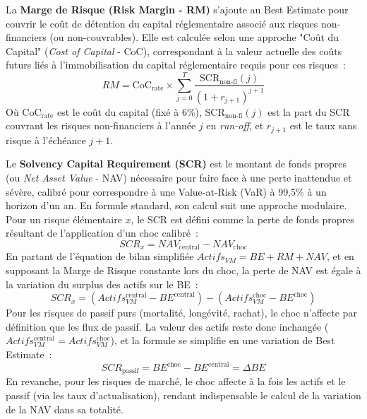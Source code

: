 \bigskip

La \textbf{Marge de Risque (Risk Margin - RM)} s'ajoute au Best Estimate pour couvrir le coût de détention du capital réglementaire associé aux risques non-financiers (ou non-couvrables). Elle est calculée selon une approche "Coût du Capital" (\textit{Cost of Capital} - CoC), correspondant à la valeur actuelle des coûts futurs liés à l'immobilisation du capital réglementaire requis pour ces risques~:
\begin{equation}
    RM = \text{CoC}_{\text{rate}} \times \sum_{j=0}^{T} \frac{\text{SCR}_{\text{non-fi}}(j)}{(1+r_{j+1})^{j+1}}
\end{equation}
Où $\text{CoC}_{\text{rate}}$ est le coût du capital (fixé à 6\%), $\text{SCR}_{\text{non-fi}}(j)$ est la part du SCR couvrant les risques non-financiers à l'année $j$ en \textit{run-off}, et $r_{j+1}$ est le taux sans risque à l'échéance $j+1$.

\bigskip

Le \textbf{Solvency Capital Requirement (SCR)} est le montant de fonds propres (ou \textit{Net Asset Value} - NAV) nécessaire pour faire face à une perte inattendue et sévère, calibré pour correspondre à une Value-at-Risk (VaR) à 99,5\% à un horizon d'un an. En formule standard, son calcul suit une approche modulaire. Pour un risque élémentaire $x$, le SCR est défini comme la perte de fonds propres résultant de l'application d'un choc calibré~:
\begin{equation}
    SCR_{x} = NAV_{\text{central}} - NAV_{\text{choc}}
\end{equation}
En partant de l'équation de bilan simplifiée $Actifs_{VM} = BE + RM + NAV$, et en supposant la Marge de Risque constante lors du choc, la perte de NAV est égale à la variation du surplus des actifs sur le BE~:
\begin{equation*}
    SCR_{x} = (Actifs_{VM}^{\text{central}} - BE^{\text{central}}) - (Actifs_{VM}^{\text{choc}} - BE^{\text{choc}})
\end{equation*}
Pour les risques de passif purs (mortalité, longévité, rachat), le choc n'affecte par définition que les flux de passif. La valeur des actifs reste donc inchangée ($Actifs_{VM}^{\text{central}} = Actifs_{VM}^{\text{choc}}$), et la formule se simplifie en une variation de Best Estimate~:
\begin{equation*}
    SCR_{\text{passif}} = BE^{\text{choc}} - BE^{\text{central}} = \Delta BE
\end{equation*}
En revanche, pour les risques de marché, le choc affecte à la fois les actifs et le passif (via les taux d'actualisation), rendant indispensable le calcul de la variation de la NAV dans sa totalité.

